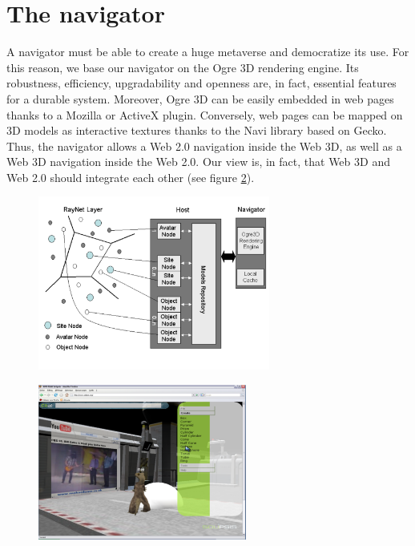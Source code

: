 \section{The navigator}
\label{sec:navigator}
A navigator must be able to create a huge metaverse and democratize
its use. For this reason, we base our navigator on the Ogre 3D
rendering engine. Its robustness, efficiency,
upgradability and openness  are, in fact, essential features for a durable
system. Moreover, Ogre 3D can be easily embedded in web pages thanks
to a Mozilla or ActiveX plugin. Conversely, web pages can be mapped
on 3D models as interactive textures thanks to the Navi library based
on Gecko. Thus, the navigator allows a Web 2.0 navigation inside the
Web 3D, as well as a Web 3D navigation inside the Web 2.0. Our view
is, in fact, that Web 3D and Web 2.0 should integrate each other (see figure
\ref{Fig:navigator}).
\begin{figure}
\center
\includegraphics[width=3in]{Figures/host.pdf}
\vspace{-3ex}
\label{Fig:host}
\end{figure}
\begin{figure}[!t]
\center
\includegraphics[width=2.7in]{Figures/navigator.pdf}
\label{Fig:navigator}
\end{figure}
